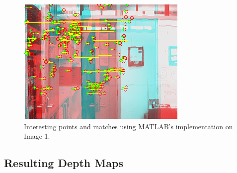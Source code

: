 \begin{figure}[h!]\centering
	\includegraphics[width=0.9\linewidth]{Images/01_our_match.png}
	\caption{Interesting points and matches using MATLAB's implementation on Image 1.}
	\label{fig:grid-example}
\end{figure}


\subsection{Resulting Depth Maps}
